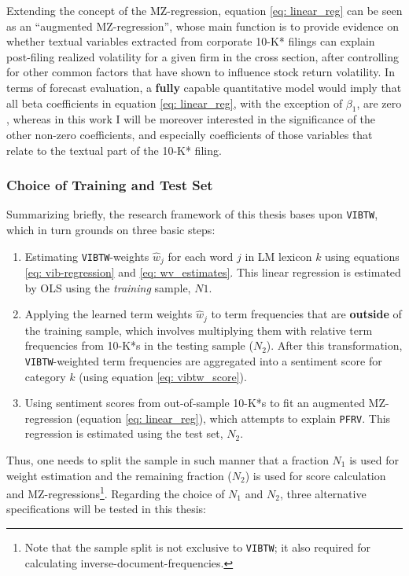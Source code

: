 Extending the concept of the MZ-regression, equation \eqref{eq: linear_reg} can be seen as an \enquote{augmented MZ-regression}, whose main function is to provide evidence on whether textual variables extracted from corporate 10-K* filings can explain post-filing realized volatility for a given firm in the cross section, after controlling for other common factors that have shown to influence stock return volatility. In terms of forecast evaluation, a \textbf{fully} capable quantitative model would imply that all beta coefficients in equation \eqref{eq: linear_reg}, with the exception of $\beta_1$, are zero \parencite{PattonSheppard2009, ViolanteLaurent2012}, whereas in this work I will be moreover interested in the significance of the other non-zero coefficients, and especially coefficients of those variables that relate to the textual part of the 10-K* filing. 

\subsubsection{Choice of Training and Test Set}
\label{sssec: volamodel_N1_N2}
Summarizing briefly,  the research framework of this thesis bases upon \texttt{VIBTW}, which in turn grounds on three basic steps:

\begin{enumerate}
\item Estimating \texttt{VIBTW}-weights $\hat{w}_{j}$ for each word $j$ in LM lexicon $k$ using equations \eqref{eq: vib-regression} and \eqref{eq: wv_estimates}. This linear regression is estimated by OLS using the \textit{training} sample, $N1$.
\item Applying the learned term weights $\hat{w}_{j}$ to term frequencies that are \textbf{outside} of the training sample, which involves multiplying them with relative term frequencies from 10-K*s in the testing sample ($N_2$). After this transformation, \texttt{VIBTW}-weighted term frequencies are aggregated into a sentiment score for category $k$ (using equation \eqref{eq: vibtw_score}). 
\item Using sentiment scores from out-of-sample 10-K*s to fit an augmented MZ-regression (equation \eqref{eq: linear_reg}), which attempts to explain \texttt{PFRV}. This regression is estimated using the test set, $N_2$. 
\end{enumerate}

Thus, one needs to split the sample in such manner that a fraction $N_1$ is used for weight estimation and the remaining fraction ($N_2$) is used for score calculation and MZ-regressions\footnote{Note that the sample split is not exclusive to \texttt{VIBTW}; it also required for calculating inverse-document-frequencies.}.
Regarding the choice of $N_1$ and $N_2$, three alternative specifications will be tested in this thesis: 

